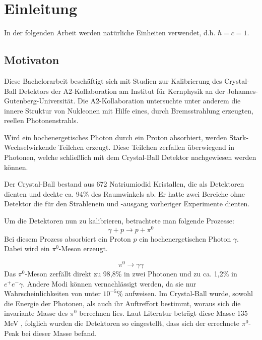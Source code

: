 \documentclass[a4paper,11pt,oneside,final,german,openbib,pdftex]{scrbook}
\begin{document}
\chapter{Einleitung}
In der folgenden Arbeit werden natürliche Einheiten verwendet, d.h. $\hbar=c=1$.
\section{Motivaton}
{
	Diese Bachelorarbeit beschäftigt sich mit Studien zur Kalibrierung des Crystal-Ball Detektors der A2-Kollaboration am Institut für Kernphysik an der Johannes-Gutenberg-Universität.
	Die A2-Kollaboration untersuchte unter anderem die innere Struktur von Nukleonen mit Hilfe eines, durch Bremsstrahlung erzeugten, reellen Photonenstrahls. 
	
	Wird ein hochenergetisches Photon durch ein Proton absorbiert, werden Stark-Wechselwirkende Teilchen erzeugt. Diese Teilchen zerfallen überwiegend in Photonen, welche schließlich mit dem Crystal-Ball Detektor nachgewiesen werden können. 
	
	Der Crystal-Ball bestand aus 672 Natriumiodid Kristallen, die als Detektoren dienten und deckte ca. 94\% des Raumwinkels ab.
	Er hatte zwei Bereiche ohne Detektor die für den Strahlenein und -ausgang vorheriger Experimente dienten.
	
	Um die Detektoren nun zu kalibrieren, betrachtete man folgende Prozesse:
\begin{equation}
	\gamma + p \rightarrow p + \pi^0
	\label{eq.gammascattering}
\end{equation} 
Bei diesem Prozess absorbiert ein Proton $p$ ein hochenergetischen Photon $\gamma$. Dabei wird ein $\pi^0$-Meson erzeugt.

	\begin{equation}
		\pi^0\rightarrow \gamma \gamma
		\label{eq.pi0decay}
	\end{equation}
Das $\pi^0$-Meson zerfällt direkt zu 98,8\% in zwei Photonen und zu ca. 1,2\% in $e^+e^- \gamma$. Andere Modi können vernachlässigt werden, da sie nur Wahrscheinlichkeiten von unter $10^{-5}$\% aufweisen. Im Crystal-Ball wurde, sowohl die Energie der Photonen, als auch ihr Auftreffort bestimmt, woraus sich die invariante Masse des $\pi^0$ berechnen lies.
Laut Literatur betr\"agt diese Masse 135 MeV \cite{PDG16}, folglich wurden die Detektoren so eingestellt, dass sich der errechnete $\pi^0$-Peak bei dieser Masse befand. 

}
\end{document}
